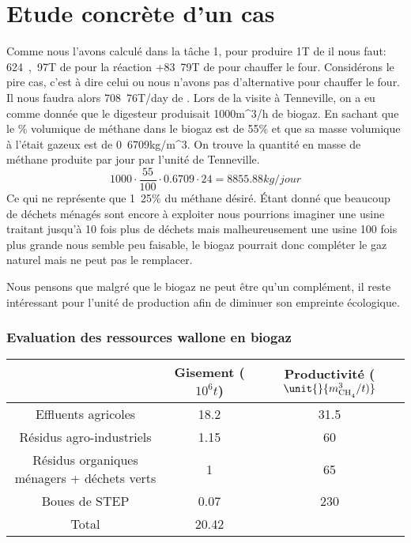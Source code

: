 \documentclass[10pt,a4paper]{article}
\begin{document}
\section{Etude concrète d'un cas}
Comme nous l'avons calculé dans la tâche 1, pour produire \unit{1}{T} de  il nous faut: \unit{624,97}{T} de  pour la réaction +\unit{83.79}{T} de  pour chauffer le four. Considérons le pire cas, c'est à dire celui ou nous n'avons pas d'alternative pour chauffer le four. 
Il nous faudra alors \unit{708.76}{T/day} de .
Lors de la visite à Tenneville, on a eu comme donnée que le digesteur produisait \unit{1000}{m^3/h} de biogaz. En sachant que le \% volumique de méthane dans le biogaz est de \unit{55}{\%} et que sa masse volumique à l'était gazeux est de \unit{0.6709}{kg/m^3}. On trouve la quantité en masse de méthane produite par jour par l'unité de Tenneville.
\begin{equation}
1000\cdot \dfrac{55}{100}\cdot 0.6709\cdot 24 = \unit{8855.88}{kg/jour}
\end{equation}
Ce qui ne représente que \unit{1.25}{\%} du méthane désiré.
Étant donné que beaucoup de déchets ménagés sont encore à exploiter nous pourrions imaginer une usine traitant jusqu'à 10 fois plus de déchets mais malheureusement une usine 100 fois plus grande nous semble peu faisable, le biogaz pourrait donc compléter le gaz naturel mais ne peut pas le remplacer.

Nous pensons que malgré que le biogaz ne peut être qu'un complément, il reste intéressant pour l'unité de production afin de diminuer son empreinte écologique.

\subsubsection{Evaluation des ressources wallone en biogaz}
\begin{center}
\begin{tabular}{|c|c|c|}
\hline 
 & Gisement ($\unit{10^6}{t}$) & Productivité ($\unit{}{m^3_{\ce{CH4}}/t)}$\\ 
\hline 
Effluents agricoles & 18.2 & 31.5  \\ 
\hline 
Résidus agro-industriels & 1.15 & 60 \\ 
\hline 
Résidus organiques ménagers + déchets verts & 1 & 65\\ 
\hline 
Boues de STEP& 0.07 & 230 \\ 
\hline 
Total & 20.42 & \\ 
\hline 
\end{tabular} 

\end{center}
\end{document}
